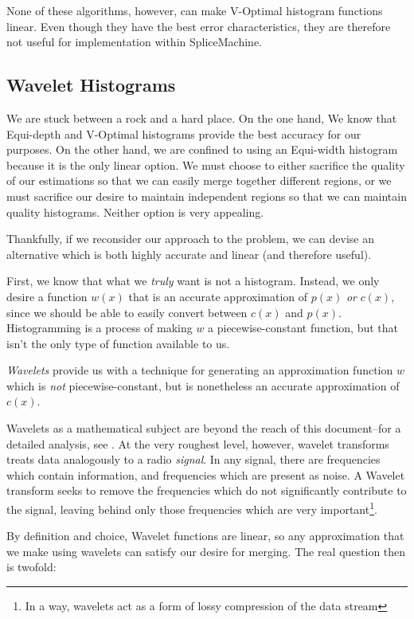 None of these algorithms, however, can make V-Optimal histogram functions linear. Even though they have the best error characteristics, they are therefore not useful for implementation within SpliceMachine.

\subsection{Wavelet Histograms}
\label{sec:Wavelets}
We are stuck between a rock and a hard place. On the one hand, We know that Equi-depth and V-Optimal histograms provide the best accuracy for our purposes. On the other hand, we are confined to using an Equi-width histogram because it is the only linear option. We must choose to either sacrifice the quality of our estimations so that we can easily merge together different regions, or we must sacrifice our desire to maintain independent regions so that we can maintain quality histograms. Neither option is very appealing.

Thankfully, if we reconsider our approach to the problem, we can devise an alternative which is both highly accurate and linear (and therefore useful).

First, we know that what we \emph{truly} want is not a histogram. Instead, we only desire a function $w(x)$ that is an accurate approximation of $p(x)$ \emph{or} $c(x)$, since we should be able to easily convert between $c(x)$ and $p(x)$. Histogramming is a process of making $w$ a piecewise-constant function, but that isn't the only type of function available to us.

\emph{Wavelets} provide us with a technique for generating an approximation function $w$ which is \emph{not} piecewise-constant, but is nonetheless an accurate approximation of $c(x)$.

Wavelets as a mathematical subject are beyond the reach of this document--for a detailed analysis, see \cite{HernandezWavelets}. At the very roughest level, however, wavelet transforms treats data analogously to a radio \emph{signal}. In any signal, there are frequencies which contain information, and frequencies which are present as noise. A Wavelet transform seeks to remove the frequencies which do not significantly contribute to the signal, leaving behind only those frequencies which are very important\footnote{In a way, wavelets act as a form of lossy compression of the data stream}.

By definition and choice, Wavelet functions are linear, so any approximation that we make using wavelets can satisfy our desire for merging. The real question then is twofold: 

